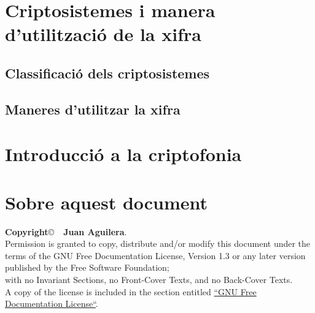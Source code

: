 \documentclass[a4paper]{article}
\begin{document}
	\section{Criptosistemes i manera d’utilització de la xifra}
	\subsection{Classificació dels criptosistemes}
	\subsection{Maneres d’utilitzar la xifra}

\section{Introducció a la criptofonia}

\section{Sobre aquest document}
\textbf{Copyright}\copyright\ \textbf{\the\year\ Juan Aguilera}.\\
Permission is granted to copy, distribute and/or modify this document under the terms of the GNU Free Documentation License, Version 1.3 or any later version published by the Free Software Foundation;\\
with no Invariant Sections, no Front-Cover Texts, and no Back-Cover Texts.\\
A copy of the license is included in the section entitled \href{http://www.gnu.org/licenses/fdl.html}{``GNU Free Documentation License``}.

\begin{thebibliography}{99}
	\bibitem{<++>} 
\end{thebibliography}
\end{document}
